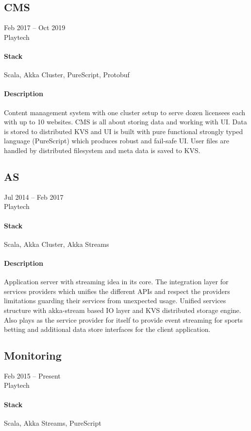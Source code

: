 \subsection{CMS}
Feb 2017 – Oct 2019\\Playtech
\paragraph{Stack} Scala, Akka Cluster, PureScript, Protobuf
\paragraph{Description}
Content management system with one cluster setup to serve dozen licensees each with up to 10 websites. CMS is all about storing data and working with UI. Data is stored to distributed KVS and UI is built with pure functional strongly typed language (PureScript) which produces robust and fail-safe UI. User files are handled by distributed filesystem and meta data is saved to KVS.

\subsection{AS}
Jul 2014 – Feb 2017\\Playtech
\paragraph{Stack} Scala, Akka Cluster, Akka Streams
\paragraph{Description}
Application server with streaming idea in its core. The integration layer for services providers which unifies the different APIs and respect the providers limitations guarding their services from unexpected usage. Unified services structure with akka-stream based IO layer and KVS distributed storage engine. Also plays as the service provider for itself to provide event streaming for sports betting and additional data store interfaces for the client application.

\subsection{Monitoring}
Feb 2015 – Present\\Playtech
\paragraph{Stack} Scala, Akka Streams, PureScript
